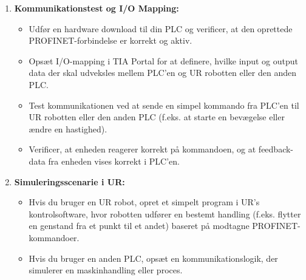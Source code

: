 \begin{enumerate}
	\item \textbf{Kommunikationstest og I/O Mapping:}
	\begin{itemize}
		\item Udfør en hardware download til din PLC og verificer, at den oprettede PROFINET-forbindelse er korrekt og aktiv.
		\item Opsæt I/O-mapping i TIA Portal for at definere, hvilke input og output data der skal udveksles mellem PLC'en og UR robotten eller den anden PLC.
		\item Test kommunikationen ved at sende en simpel kommando fra PLC'en til UR robotten eller den anden PLC (f.eks. at starte en bevægelse eller ændre en hastighed).
		\item Verificer, at enheden reagerer korrekt på kommandoen, og at feedback-data fra enheden vises korrekt i PLC'en.
	\end{itemize}
	
	\item \textbf{Simuleringsscenarie i UR:}
	\begin{itemize}
		\item Hvis du bruger en UR robot, opret et simpelt program i UR's kontrolsoftware, hvor robotten udfører en bestemt handling (f.eks. flytter en genstand fra et punkt til et andet) baseret på modtagne PROFINET-kommandoer.
		\item Hvis du bruger en anden PLC, opsæt en kommunikationslogik, der simulerer en maskinhandling eller proces.
	\end{itemize}
\end{enumerate}

